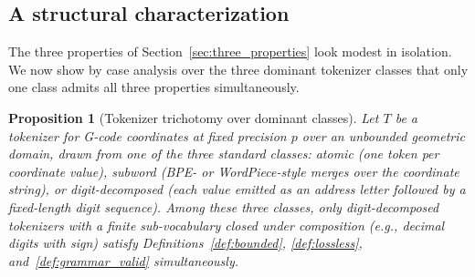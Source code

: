 \documentclass[11pt]{article}
\newtheorem{proposition}[definition]{Proposition}
\begin{document}
\subsection{A structural characterization}
\label{sec:impossibility}

The three properties of Section~\ref{sec:three_properties} look modest in isolation. We now show by case analysis over the three dominant tokenizer classes that only one class admits all three properties simultaneously.

\begin{proposition}[Tokenizer trichotomy over dominant classes]
\label{prop:trichotomy}
Let $T$ be a tokenizer for G-code coordinates at fixed precision $p$ over an unbounded geometric domain, drawn from one of the three standard classes: atomic (one token per coordinate value), subword (BPE- or WordPiece-style merges over the coordinate string), or digit-decomposed (each value emitted as an address letter followed by a fixed-length digit sequence). Among these three classes, only digit-decomposed tokenizers with a finite sub-vocabulary closed under composition (e.g., decimal digits with sign) satisfy Definitions~\ref{def:bounded}, \ref{def:lossless}, and~\ref{def:grammar_valid} simultaneously.
\end{proposition}
\end{document}
